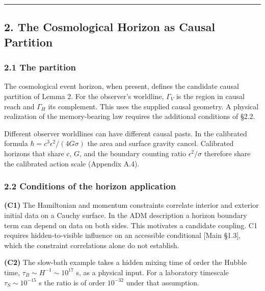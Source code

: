 \documentclass[
]{article}
\begin{document}
\begin{center}\rule{0.5\linewidth}{0.5pt}\end{center}

\hypertarget{the-cosmological-horizon-as-causal-partition}{%
\subsection{2. The Cosmological Horizon as Causal
Partition}\label{the-cosmological-horizon-as-causal-partition}}

\hypertarget{the-partition}{%
\subsubsection{2.1 The partition}\label{the-partition}}

The cosmological event horizon, when present, defines the candidate
causal partition of Lemma 2. For the observer's worldline, \(\Gamma_V\)
is the region in causal reach and \(\Gamma_H\) its complement. This uses
the supplied causal geometry. A physical realization of the
memory-bearing law requires the additional conditions of §2.2.

Different observer worldlines can have different causal pasts. In the
calibrated formula \(\hbar=c^3\epsilon^2/(4G\sigma)\) the area and
surface gravity cancel. Calibrated horizons that share \(c\), \(G\), and
the boundary counting ratio \(\epsilon^2/\sigma\) therefore share the
calibrated action scale (Appendix A.4).

\hypertarget{conditions-of-the-horizon-application}{%
\subsubsection{2.2 Conditions of the horizon
application}\label{conditions-of-the-horizon-application}}

\textbf{(C1)} The Hamiltonian and momentum constraints correlate
interior and exterior initial data on a Cauchy surface. In the ADM
description a horizon boundary term can depend on data on both sides.
This motivates a candidate coupling. C1 requires hidden-to-visible
influence on an accessible conditional {[}Main §1.3{]}, which the
constraint correlations alone do not establish.

\textbf{(C2)} The slow-bath example takes a hidden mixing time of order
the Hubble time, \(\tau_B\sim H^{-1}\sim10^{17}\) s, as a physical
input. For a laboratory timescale \(\tau_S\sim10^{-15}\) s the ratio is
of order \(10^{-32}\) under that assumption.
\end{document}
